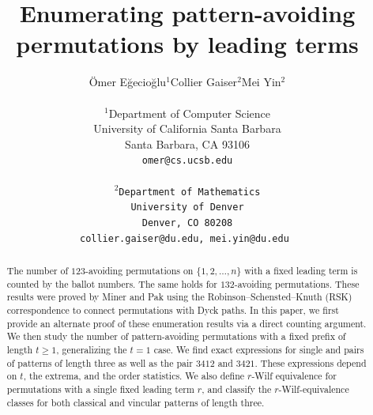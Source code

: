\documentclass[11pt]{article}
\theoremstyle{definition}
\numberwithin{equation}{section}
\begin{document}
\title{Enumerating pattern-avoiding permutations by leading terms}

\author{\"{O}mer E\u{g}ecio\u{g}lu$^1$\qquad Collier Gaiser$^{2}$\qquad Mei Yin$^2$\\ \\
\small $^1$Department of Computer Science \\
\small University of California Santa Barbara \\
\small Santa Barbara, CA 93106\\
\small \tt omer@cs.ucsb.edu
\\
\\
\small $^2$Department of Mathematics \\
\small University of Denver\\
\small Denver, CO 80208\\
\small \tt collier.gaiser@du.edu, mei.yin@du.edu
}


\date{}

\maketitle

\begin{abstract}
The number of $123$-avoiding permutations on $\{1,2,\ldots,n\}$ with a fixed leading 
term is counted by the ballot numbers. The same holds for $132$-avoiding permutations.
These results were proved by Miner and Pak 
using the Robinson–Schensted–Knuth (RSK) correspondence to connect permutations with Dyck paths. 
In this paper, we first provide an alternate proof of these enumeration results via a
direct counting argument.
We then study the number of pattern-avoiding permutations 
with a fixed prefix of length $t\geq 1$, generalizing the $t=1 $ case.
We find exact expressions for single and pairs of patterns of 
length three as well as the pair $3412$ and $3421$. 
These expressions depend on $t$, the extrema, and the order statistics.
We also define $r$-Wilf equivalence for permutations with a 
single fixed leading term $r$, and classify the $r$-Wilf-equivalence classes for both 
classical and vincular patterns of length three.
\end{abstract}
\end{document}
